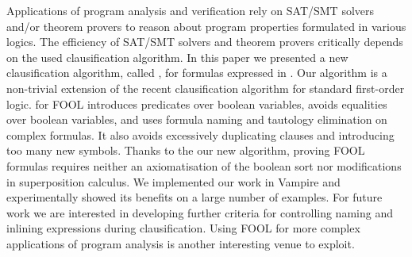 
Applications of program analysis and verification rely on SAT/SMT solvers and/or
theorem provers to reason about program properties formulated in various logics.
The efficiency of SAT/SMT solvers and theorem provers critically depends on the used clausification algorithm. 
In this paper we presented a new clausification algorithm, called \nfcnf{}, for formulas expressed in \folb{}. 
Our algorithm is a non-trivial extension of the recent \newcnf{} clausification
algorithm for standard first-order logic.  \nfcnf{} for FOOL    
introduces \skolem{} predicates over boolean variables, avoids equalities over
boolean variables, and uses formula naming and tautology elimination on complex
formulas. 
It also avoids excessively duplicating clauses and introducing too many new
symbols. 
Thanks to the our new  \nfcnf{}  algorithm, proving FOOL formulas requires neither an
axiomatisation of 
the boolean sort nor modifications in superposition calculus. 
We implemented our work in Vampire and
experimentally showed its benefits on a large number of examples.  
For future work we are interested in developing further criteria for
controlling naming and inlining expressions during clausification. Using FOOL
for more complex applications of program analysis is another interesting venue to
exploit.



